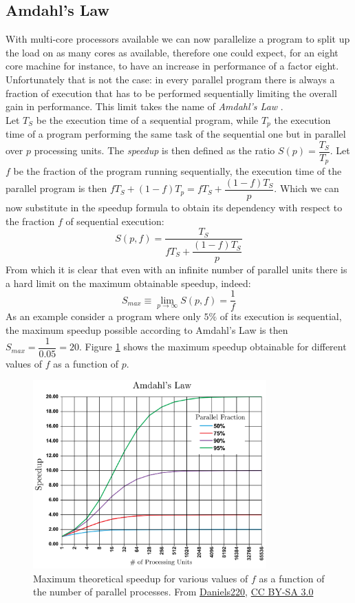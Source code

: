 \subsection{Amdahl's Law}
With multi-core processors available we can now parallelize a program to split up the load on as many cores as available, therefore one could expect, for an eight core machine for instance, to have an increase in performance of a factor eight. Unfortunately that is not the case: in every parallel program there is always a fraction of execution that has to be performed sequentially limiting the overall gain in performance. This limit takes the name of \textit{Amdahl's Law} \cite{amdahl}.\\
Let $T_S$ be the execution time of a sequential program, while $T_p$ the execution time of a program performing the same task of the sequential one but in parallel over $p$ processing units. The \textit{speedup} is then defined as the ratio $S(p) = \dfrac{T_S}{T_p}$.
Let $f$ be the fraction of the program running sequentially, the execution time of the parallel program is then $f T_S + (1 - f) T_p = f T_S + \dfrac{(1-f)T_S}{p}$. Which we can now substitute in the speedup formula to obtain its dependency with respect to the fraction $f$ of sequential execution:
\begin{equation}
S(p,f) = \dfrac{T_S}{f T_S + \dfrac{(1-f)T_S}{p}}
\end{equation}
From which it is clear that even with an infinite number of parallel units there is a hard limit on the maximum obtainable speedup, indeed:
\begin{equation}
S_{max} \equiv \lim_{p\to\infty} S(p,f) = \dfrac{1}{f}
\end{equation}
As an example consider a program where only $5\%$ of its execution is sequential, the maximum speedup possible according to Amdahl's Law is then $S_{max} = \dfrac{1}{0.05} = 20$.
Figure \ref{amdahl} shows the maximum speedup obtainable for different values of $f$ as a function of $p$.

\begin{figure}
\centerline{\includegraphics[width=0.8\textwidth]{architectures/amdahl.png}}
\caption{Maximum theoretical speedup for various values of $f$ as a function of the number of parallel processes. From \href{https://en.wikipedia.org/wiki/User:Daniels220}{Daniels220}, \href{http://creativecommons.org/licenses/by-sa/3.0/}{CC BY-SA 3.0}}
\label{amdahl}
\end{figure}

